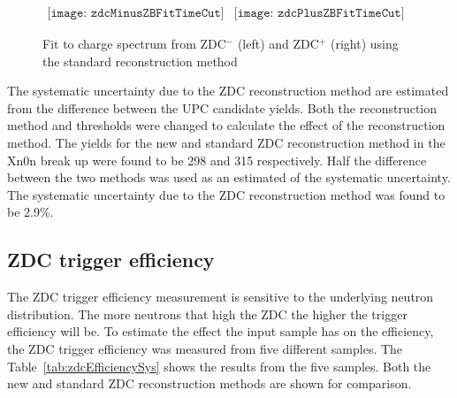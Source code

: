       \begin{figure}[!Hhtb]
        \centering
        $ \begin{array}{cc}
          \texttt{[image: zdcMinusZBFitTimeCut]} &
          \texttt{[image: zdcPlusZBFitTimeCut]}
        \end{array} $
        \caption{Fit to charge spectrum from ZDC$^{-}$ (left) and ZDC$^{+}$ 
          (right) using the standard reconstruction method}
        \label{fig:zdcM1Fit}
      \end{figure}

      The systematic uncertainty due to the ZDC reconstruction method are
        estimated from the difference between the UPC \JPsi{} candidate yields.
      Both the reconstruction method and thresholds were changed to calculate 
        the effect of the reconstruction method.
      The yields for the new and standard ZDC reconstruction method in the Xn0n
        break up were found to be 298 and 315 respectively. 
      Half the difference between the two methods was used as an estimated of 
        the systematic uncertainty.
      The systematic uncertainty due to the ZDC reconstruction method was 
        found to be 2.9\%.

    \subsection{ZDC trigger efficiency}
      The ZDC trigger efficiency measurement is sensitive to the underlying 
        neutron distribution.
      The more neutrons that high the ZDC the higher the trigger efficiency 
        will be.
      To estimate the effect the input sample has on the efficiency, the ZDC 
        trigger efficiency was measured from five different samples.
      The Table~\ref{tab:zdcEfficiencySys} shows the results from the 
       five samples. 
      Both the new and standard ZDC reconstruction methods are shown for 
        comparison.

